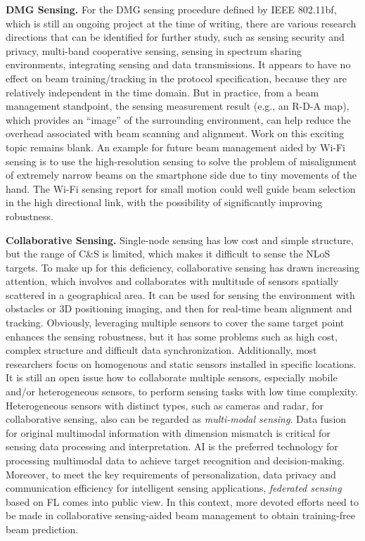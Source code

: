 \documentclass[journal,comsoc]{IEEEtran}
\begin{document}
{\bf{DMG Sensing.}} For the DMG sensing procedure defined by IEEE 802.11bf, which is still an ongoing project at the time of writing, there are various research directions that can be identified for further study, such as sensing security and privacy, multi-band cooperative sensing, sensing in spectrum sharing environments, integrating sensing and data transmissions. It appears to have no effect on beam training/tracking in the protocol specification, because they are relatively independent in the time domain. But in practice, from a beam management standpoint, the sensing measurement result (e.g., an R-D-A map), which provides an ``image'' of the surrounding environment, can help reduce the overhead associated with beam scanning and alignment. Work on this exciting topic remains blank. An example for future beam management aided by Wi-Fi sensing is to use the high-resolution sensing to solve the problem of misalignment of extremely narrow beams on the smartphone side due to tiny movements of the hand. The Wi-Fi sensing report for small motion could well guide beam selection in the high directional link, with the possibility of significantly improving robustness.


{\bf{Collaborative Sensing.}} Single-node sensing has low cost and simple structure, but the range of C\&S is limited, which makes it difficult to sense the NLoS targets. To make up for this deficiency, collaborative sensing \cite{Collaborative-Sensing-2022} has drawn increasing attention, which involves and collaborates with multitude of sensors spatially scattered in a geographical area. It can be used for sensing the environment with obstacles or 3D positioning imaging, and then for real-time beam alignment and tracking. Obviously, leveraging multiple sensors to cover the same target point enhances the sensing robustness, but it has some problems such as high cost, complex structure and difficult data synchronization. Additionally, most researchers focus on homogenous and static sensors installed in specific locations. It is still an open issue how to collaborate multiple sensors, especially mobile and/or heterogeneous sensors, to perform sensing tasks with low time complexity. Heterogeneous sensors with distinct types, such as cameras and radar, for collaborative sensing, also can be regarded as \emph{multi-modal sensing}. Data fusion for original  multimodal information with dimension mismatch is critical for sensing data processing and interpretation. AI is the preferred technology for processing multimodal data to achieve target recognition and decision-making. Moreover, to meet the key requirements of personalization, data privacy and communication efficiency for intelligent sensing applications, \emph{federated sensing} \cite{Federated-Sensing-2021} based on FL comes into public view. In this context, more devoted efforts need to be made in collaborative sensing-aided beam management to obtain training-free beam prediction.
\end{document}
